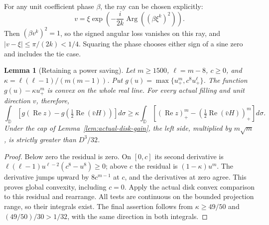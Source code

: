 \documentclass[11pt]{article}
\newtheorem{lemma}[theorem]{Lemma}
\newcommand{\D}{\mathbb D}
\begin{document}
	For any unit coefficient phase $\beta$, the ray can be chosen
	explicitly:
	\[
	v=\xi\exp\!\left(-\frac{i}{2k}
	\operatorname{Arg}((\beta\xi^k)^2)\right).
	\]
	Then $(\beta v^k)^2=1$, so the signed angular loss vanishes on
	this ray, and $|v-\xi|\leq\pi/(2k)<1/4$.  Squaring the phase
	chooses either sign of a sine zero and includes the tie case.
	
	\begin{lemma}[Retaining a power saving]\label{lem:two-power-retention}
		Let $m\geq1500$, $\ell=m-8$, $c\geq0$, and
		$\kappa=\ell(\ell-1)/(m(m-1))$.  Put
		$g(u)=\max\{u_+^m,c^8u_+^\ell\}$.
		The function $g(u)-\kappa u_+^m$ is convex on the whole real line.
		For every actual filling and unit direction $v$, therefore,
		\[
		\int_{\D}\!\left[g(\operatorname{Re}z)
		-g\!\left(\tfrac12\operatorname{Re}(\bar vH)\right)\right]d\sigma
		\geq\kappa\int_{\D}\!\left[(\operatorname{Re}z)_+^m
		-\left(\tfrac12\operatorname{Re}(\bar vH)\right)_+^m\right]d\sigma.
		\]
		Under the cap of Lemma~\ref{lem:actual-disk-gain}, the left side,
		multiplied by $m\sqrt m$, is strictly greater than $D^3/32$.
	\end{lemma}
	\begin{proof}
		Below zero the residual is zero.  On $[0,c]$ its second
		derivative is
		$\ell(\ell-1)u^{\ell-2}(c^8-u^8)\geq0$; above $c$ the residual
		is $(1-\kappa)u^m$.  The derivative jumps upward by
		$8c^{m-1}$ at $c$, and the derivatives at zero agree.
		This proves global convexity, including $c=0$.
		Apply the actual disk convex comparison to this residual and
		rearrange.  All tests are continuous on the bounded projection
		range, so their integrals exist.  The final assertion follows
		from $\kappa\geq49/50$ and
		$(49/50)/30>1/32$, with the same direction in both integrals.
	\end{proof}
	
\end{document}
